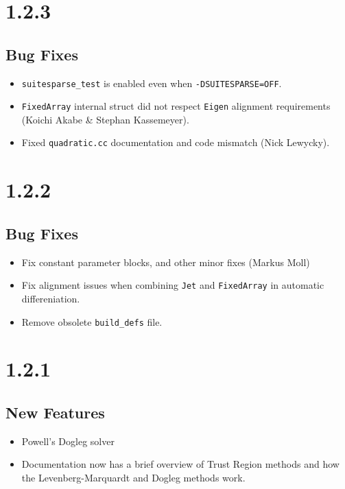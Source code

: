 \section*{1.2.3}
\subsection{Bug Fixes}
\begin{itemize}
\item \texttt{suitesparse\_test} is enabled even when \texttt{-DSUITESPARSE=OFF}.
\item \texttt{FixedArray} internal struct did not respect \texttt{Eigen}
  alignment requirements (Koichi Akabe \& Stephan Kassemeyer).
\item Fixed \texttt{quadratic.cc} documentation and code mismatch
  (Nick Lewycky).
\end{itemize}
\section*{1.2.2}
\subsection{Bug Fixes}
\begin{itemize}
\item Fix constant parameter blocks, and other minor fixes (Markus Moll)
\item Fix alignment issues when combining \texttt{Jet} and
  \texttt{FixedArray} in automatic differeniation.
\item Remove obsolete \texttt{build\_defs} file.
\end{itemize}
\section*{1.2.1}
\subsection{New Features}
\begin{itemize}
\item Powell's Dogleg solver
\item Documentation now has a brief overview of Trust Region methods and how the Levenberg-Marquardt and Dogleg methods work.
\end{itemize}
